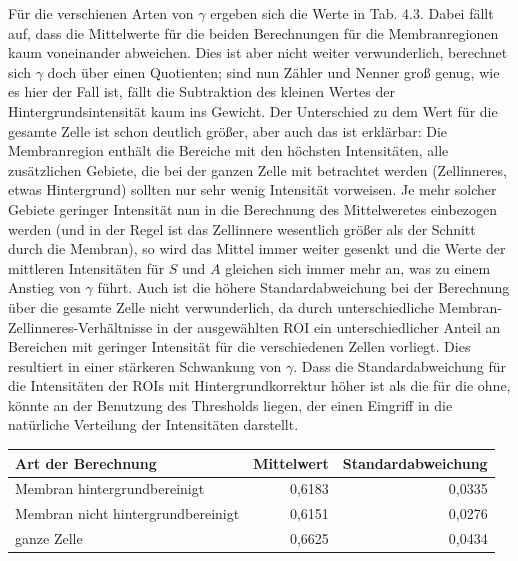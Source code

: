 Für die verschienen Arten von $\gamma$ ergeben sich die Werte in Tab. 4.3. Dabei fällt auf, dass die Mittelwerte für die beiden 
Berechnungen für die Membranregionen kaum voneinander abweichen. Dies ist aber nicht weiter verwunderlich, berechnet sich $\gamma$ doch 
über einen Quotienten; sind nun Zähler und Nenner groß genug, wie es hier der Fall ist, fällt die Subtraktion des kleinen Wertes der 
Hintergrundsintensität kaum ins Gewicht. Der Unterschied zu dem Wert für die gesamte Zelle ist schon deutlich größer, aber auch das 
ist erklärbar: Die Membranregion enthält die Bereiche mit den höchsten Intensitäten, alle zusätzlichen Gebiete, die bei der ganzen Zelle 
mit betrachtet werden (Zellinneres, etwas Hintergrund) sollten nur sehr wenig Intensität vorweisen. Je mehr solcher Gebiete geringer 
Intensität nun in die Berechnung des Mittelweretes einbezogen werden (und in der Regel ist das Zellinnere wesentlich größer als der 
Schnitt durch die Membran), so wird das Mittel immer weiter gesenkt und die Werte der mittleren Intensitäten für $S$ und $A$ gleichen sich 
immer mehr an, was zu einem Anstieg von $\gamma$ führt. Auch ist die höhere Standardabweichung bei der Berechnung über die gesamte Zelle 
nicht verwunderlich, da durch unterschiedliche Membran-Zellinneres-Verhältnisse in der ausgewählten ROI ein unterschiedlicher Anteil an 
Bereichen mit geringer Intensität für die verschiedenen Zellen vorliegt. Dies resultiert in einer stärkeren Schwankung von $\gamma$. 
Dass die Standardabweichung für die Intensitäten der ROIs mit Hintergrundkorrektur höher ist als die für die ohne, könnte an der Benutzung 
des Thresholds liegen, der einen Eingriff in die natürliche Verteilung der Intensitäten darstellt.

\begin{center}
    \centering
    \begin{tabular}{lrr}
        Art der Berechnung & Mittelwert & Standardabweichung \\
        \hline
        Membran hintergrundbereinigt & 0,6183 & 0,0335 \\
        Membran nicht hintergrundbereinigt & 0,6151 & 0,0276 \\
        ganze Zelle & 0,6625 & 0,0434 \\
        
    \end{tabular}
\end{center}
\label{tab:gamma}




